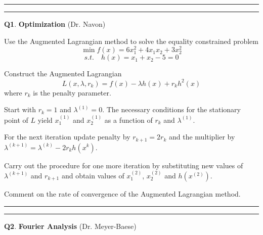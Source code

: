 \documentclass[11pt,letterpaper]{article}
\newcommand{\highlight}[1]{\textcolor{BrickRed}{#1}}
\begin{document}
\medskip
\hrule

\pagebreak
\hrule 
\medskip
\textbf{Q1}. \highlight{\textbf{Optimization}} (Dr. Navon)
\label{q1}
\bigskip

Use the Augmented Lagrangian method to solve the equality constrained problem
$$\min f(x)=6x_1^2 + 4x_1x_2 + 3x_2^2$$
$$ s.t. \quad h(x)=x_1 +x_2 -5 =0$$

Construct the Augmented Lagrangian
$$L(x,\lambda , r_k) = f(x) - \lambda h(x) + r_k h^2 (x)$$
where $r_k$ is the penalty parameter.

Start with $r_k=1$ and $\lambda ^{(1)} = 0$. The necessary conditions for the stationary point of $L$ yield $x_1^{(1)}$ and $x_2^{(1)}$ as a function of $r_k$ and $\lambda^{(1)}$.

\medskip

For the next iteration update penalty by $r_{k+1} = 2 r_k$ and the multiplier
by $\lambda^{(k+1)} = \lambda^{(k)} - 2 r_k h(x^k)$.

\medskip

Carry out the procedure for one more iteration by  substituting new values of $\lambda^{(k+1)}$ and $r_{k+1}$  and obtain values of $x_1^{(2)}$, $x_2^{(2)}$ and $h(x^{(2)})$.

\medskip

Comment on the rate of convergence of the Augmented Lagrangian method.

\bigskip
\hrule \medskip

\pagebreak


\pagebreak
\hrule 
\medskip
\textbf{Q2}. \highlight{\textbf{Fourier Analysis}} (Dr. Meyer-Baese)
\label{q2}
\bigskip
\end{document}
